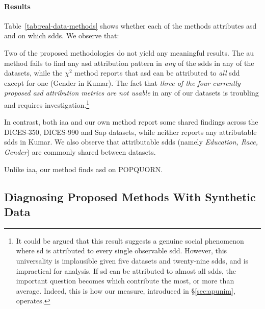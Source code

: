 \documentclass[manuscript,screen,review,anonymous]{acmart}
\theoremstyle{acmplain}
\theoremstyle{researchquestionstyle}
\begin{document}
\paragraph{Results} Table~\ref{tab:real-data-methods} shows whether each of the methods attributes \ac{asd} and on which \acp{sdd}. We observe that:
\begin{enumerate*}
	\item Two of the proposed methodologies do not yield any meaningful results. The \ac{au} method fails to find any \ac{asd} attribution pattern in \emph{any} of the \acp{sdd} in any of the datasets, while the $\chi^2$ method reports that \ac{asd} can be attributed to \emph{all} \ac{sdd} except for one (Gender in Kumar). The fact that \emph{three of the four currently proposed \ac{asd} attribution metrics are not usable} in any of our datasets is troubling and requires investigation.\footnote{It could be argued that this result suggests a genuine social phenomenon where \ac{sd} is attributed to every single observable \ac{sdd}. However, this universality is implausible given five datasets and twenty-nine \acp{sdd}, and is impractical for analysis. If \ac{sd} can be attributed to almost all \acp{sdd}, the important question becomes which contribute the most, or more than average. Indeed, this is how our measure, introduced in \S\ref{sec:apunim}, operates.}
	
	\item In contrast, both \ac{iaa} and our own method report some shared findings across the DICES-350, DICES-990 and Sap datasets, while neither reports any attributable \acp{sdd} in Kumar. We also observe that attributable \acp{sdd} (namely \textit{Education, Race, Gender}) are commonly shared between datasets.
	
	\item Unlike \ac{iaa}, our method finds \ac{asd} on POPQUORN.
\end{enumerate*} 


\subsection{Diagnosing Proposed Methods With Synthetic Data}
\end{document}
